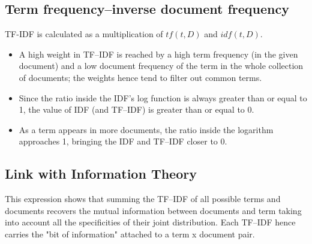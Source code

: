 \subsection{Term frequency–inverse document frequency}
TF-IDF is calculated as a multiplication of $tf(t, D)$ and $idf(t, D)$. 
\begin{itemize}
	\item A high weight in TF–IDF is reached by a high term frequency (in the given document) and a low document frequency of the term in the whole collection of documents; the weights hence tend to filter out common terms. 
	\item Since the ratio inside the IDF's log function is always greater than or equal to 1, the value of IDF (and TF–IDF) is greater than or equal to 0. 
	\item As a term appears in more documents, the ratio inside the logarithm approaches 1, bringing the IDF and TF–IDF closer to 0. 
\end{itemize}





\subsection{Link with Information Theory}
This expression shows that summing the TF–IDF of all possible terms and documents recovers the mutual information between documents and term taking into account all the specificities of their joint distribution. Each TF–IDF hence carries the "bit of information" attached to a term x document pair. 


